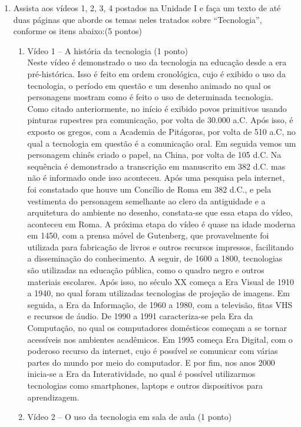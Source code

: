 \documentclass[a4paper, 12pt]{article}
\begin{document}
\begin{enumerate}
\item Assista aos vídeos 1, 2, 3, 4  postados na Unidade I e faça um texto de até duas páginas que aborde os temas neles tratados sobre “Tecnologia”, conforme os itens abaixo:(5 pontos)
  \begin{enumerate}
  \item Vídeo 1 – A história da tecnologia (1 ponto) \\    
    Neste vídeo é demonstrado o uso da tecnologia na educação desde a era pré-histórica. Isso é feito em ordem cronológica, cujo é exibido o uso da tecnologia, o período em questão e um desenho animado no qual os personagens mostram como é feito o uso de determinada tecnologia. \\
    Como citado anteriormente, no início é exibido povos primitivos usando pinturas rupestres pra comunicação, por volta de 30.000 a.C. Após isso, é exposto os gregos, com a Academia de Pitágoras, por volta de 510 a.C, no qual a tecnologia em questão é a comunicação oral. Em seguida vemos um personagem chinês criado o papel, na China, por volta de 105 d.C. Na sequência é demonstrado a transcrição em manuscrito em 382 d.C. mas não é informado onde isso aconteceu. Após uma pesquisa pela internet, foi constatado que houve um Concílio de Roma em 382 d.C., e pela vestimenta do personagem semelhante ao clero da antiguidade e a arquitetura do ambiente no desenho, constata-se que essa etapa do vídeo, aconteceu em Roma. A próxima etapa do vídeo é quase na idade moderna em 1450, com a prensa móvel de Gutenberg, que provavelmente foi utilizada para fabricação de livros e outros recursos impressos, facilitando a disseminação do conhecimento. A seguir, de 1600 a 1800, tecnologias são utilizadas na educação pública, como o quadro negro e outros materiais escolares. Após isso, no século XX começa a Era Visual de 1910 a 1940, no qual foram utilizadas tecnologias de projeção de imagens. Em seguida, a Era da Informação, de 1960 a 1980, com a televisão, fitas VHS e recursos de áudio. De 1990 a 1991 caracteriza-se pela Era da Computação, no qual os computadores domésticos começam a se tornar acessíveis nos ambientes acadêmicos. Em 1995 começa Era Digital, com o poderoso recurso da internet, cujo é possível se comunicar com várias partes do mundo por meio do computador. E por fim, nos anos 2000 inicia-se a Era da Interatividade, no qual é possível utilizarmos tecnologias como smartphones, laptops e outros dispositivos para aprendizagem.  \\
  \item Vídeo 2 – O uso da tecnologia em sala de aula (1 ponto) \\

\end{enumerate}
\end{enumerate}
\end{document}
